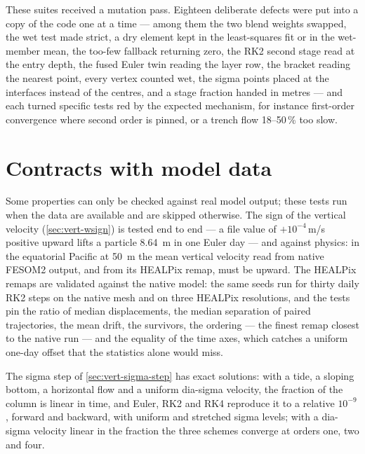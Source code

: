 These suites received a mutation pass. Eighteen deliberate defects were put into a copy of the code one at
a time --- among them the two blend weights swapped, the wet test made strict, a dry element kept in the
least-squares fit or in the wet-member mean, the too-few fallback returning zero, the RK2 second stage
read at the entry depth, the fused Euler twin reading the layer row, the bracket reading the nearest point,
every vertex counted wet, the sigma points placed at the interfaces instead of the centres, and a stage
fraction handed in metres --- and each turned specific tests red by the expected mechanism, for instance
first-order convergence where second order is pinned, or a trench flow 18--50\,\% too slow.


\section{Contracts with model data}\label{sec:val-data}

Some properties can only be checked against real model output; these tests run when the data are available
and are skipped otherwise. The sign of the vertical velocity (\cref{sec:vert-wsign}) is tested end to end ---
a file value of $+10^{-4}$\,m/s positive upward lifts a particle \SI{8.64}{\metre} in one Euler day --- and
against physics: in the equatorial Pacific at \SI{50}{\metre} the mean vertical velocity read from native
FESOM2 output, and from its HEALPix remap, must be upward. The HEALPix remaps are validated against the native
model: the same seeds run for thirty daily RK2 steps on the native mesh and on three HEALPix resolutions, and
the tests pin the ratio of median displacements, the median separation of paired trajectories, the mean
drift, the survivors, the ordering --- the finest remap closest to the native run --- and the equality of the
time axes, which catches a uniform one-day offset that the statistics alone would miss.

The sigma step of \cref{sec:vert-sigma-step} has exact solutions: with a tide, a sloping bottom, a horizontal
flow and a uniform dia-sigma velocity, the fraction of the column is linear in time, and Euler, RK2 and RK4
reproduce it to a relative $10^{-9}$, forward and backward, with uniform and stretched sigma levels; with a
dia-sigma velocity linear in the fraction the three schemes converge at orders one, two and four.

